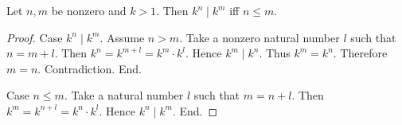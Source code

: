\documentclass[../../natural-numbers.ftl.tex]{subfiles}
\begin{document}
\begin{forthel}
    \begin{proposition}[NN 03 01 499003]
      Let $n,m$ be nonzero and $k > 1$.
      Then $k^{n} \mid k^{m}$ iff $n \leq m$.
    \end{proposition}
    \begin{proof}
      Case $k^{n} \mid k^{m}$.
        Assume $n > m$.
        Take a nonzero natural number $l$ such that $n = m + l$.
        Then $k^{n} = k^{m + l} = k^{m} \cdot k^{l}$.
        Hence $k^{m} \mid k^{n}$.
        Thus $k^{m} = k^{n}$.
        Therefore $m = n$.
        Contradiction.
      End.

      Case $n \leq m$.
        Take a natural number $l$ such that $m = n + l$.
        Then $k^{m} = k^{n + l} = k^{n} \cdot k^{l}$.
        Hence $k^{n} \mid k^{m}$.
      End.
    \end{proof}
  \end{forthel}
\end{document}
